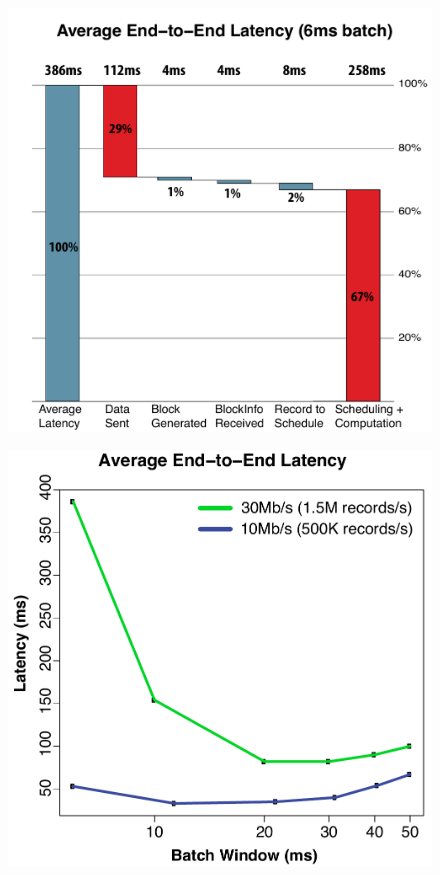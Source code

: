 
\begin{figure}[t!]
  \begin{center}
    \includegraphics[scale=0.30]{images_graphs/waterfall/6ms_time_breakdown.pdf}
  \end{center}
  \caption{}
  \label{fig:SparkStreaming_time_breakdown}
\end{figure}

\begin{figure}[t!]
  \begin{center}
    \includegraphics[scale=0.30]{images_graphs/batchsize_vs_latency/batchsize_vs_latency3.pdf}
  \end{center}
  \caption{}
  \label{fig:Batchsize_vs_latency}
\end{figure}

